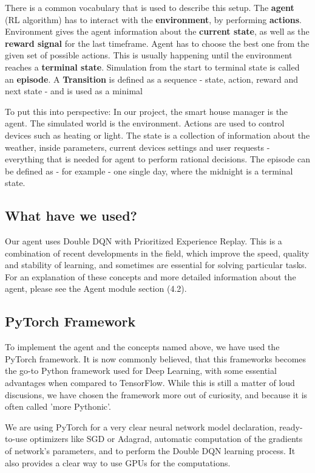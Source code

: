 \documentclass{article}
\begin{document}
There is a common vocabulary that is used to describe this setup. The \textbf{agent} (RL algorithm) has to interact with the \textbf{environment}, by performing \textbf{actions}. Environment gives the agent information about the \textbf{current state}, as well as the \textbf{reward signal} for the last timeframe. Agent has to choose the best one from the given set of possible actions. This is usually happening until the environment reaches a \textbf{terminal state}. Simulation from the start to terminal state is called an \textbf{episode}. A \textbf{Transition} is defined as a sequence - state, action, reward and next state - and is used as a minimal

To put this into perspective: In our project, the smart house manager is the agent. The simulated world is the environment. Actions are used to control devices such as heating or light. The state is a collection of information about the weather, inside parameters, current devices settings and user requests - everything that is needed for agent to perform rational decisions. The episode can be defined as - for example - one single day, where the midnight is a terminal state.
\subsection{What have we used?}
Our agent uses Double DQN with Prioritized Experience Replay. This is a combination of recent developments in the field, which improve the speed, quality and stability of learning, and sometimes are essential for solving particular tasks. For an explanation of these concepts and more detailed information about the agent, please see the Agent module section (4.2).
\subsection{PyTorch Framework}
To implement the agent and the concepts named above, we have used the PyTorch framework. It is now commonly believed, that this frameworks becomes the go-to Python framework used for Deep Learning, with some essential advantages when compared to TensorFlow. While this is still a matter of loud discusions, we have chosen the framework more out of curiosity, and because it is often called 'more Pythonic'.

We are using PyTorch for a very clear neural network model declaration, ready-to-use optimizers like SGD or Adagrad, automatic computation of the gradients of network's parameters, and to perform the Double DQN learning process. It also provides a clear way to use GPUs for the computations. 
\end{document}
